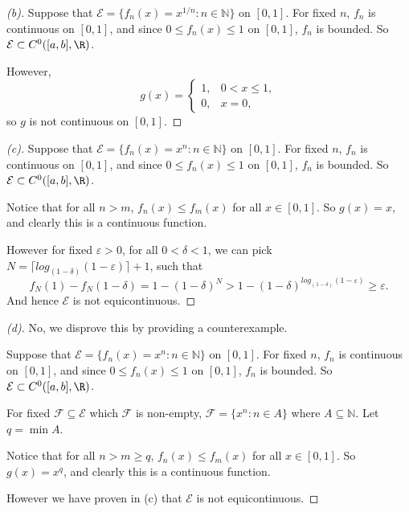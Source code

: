 \begin{proof}[(b)]
    Suppose that $\mathcal E = \{f_n(x) = x^{1/n} : n \in \mathbb{N}\}$ on $[0,1]$. For fixed $n$, $f_n$ is continuous on $[0,1]$, and since $0 \le f_n(x) \le 1$ on $[0,1]$, $f_n$ is bounded. So $\mathcal E\subset C^0([a,b], \R )$.

    However, 
    \[
        g(x)=
        \begin{cases}
        1, & 0 < x \le 1,\\
        0, & x = 0,
        \end{cases}
    \]
    so $g$ is not continuous on $[0,1]$.
\end{proof}

\begin{proof}[(c)]
    Suppose that $\mathcal E = \{f_n(x) = x^{n} : n \in \mathbb{N}\}$ on $[0,1]$. For fixed $n$, $f_n$ is continuous on $[0,1]$, and since $0 \le f_n(x) \le 1$ on $[0,1]$, $f_n$ is bounded. So $\mathcal E\subset C^0([a,b], \R )$.

    Notice that for all $n > m$, $f_n(x) \le f_m(x)$ for all $x \in [0,1]$. So $g(x) = x$, and clearly this is a continuous function.

    However for fixed $\varepsilon > 0$, for all $0 < \delta < 1$, we can pick $N = \lceil log_{(1-\delta)}(1-\varepsilon) \rceil + 1$, such that
    \[
        f_N(1) - f_N(1-\delta) = 1 - (1-\delta)^{N}  > 1 - (1-\delta) ^ {log_{(1-\delta)}(1-\varepsilon)} \ge \varepsilon.
    \]
    And hence $\mathcal E$ is not equicontinuous.

\end{proof}

\begin{proof}[(d)]
    No, we disprove this by providing a counterexample.

    Suppose that $\mathcal E = \{f_n(x) = x^{n} : n \in \mathbb{N}\}$ on $[0,1]$. For fixed $n$, $f_n$ is continuous on $[0,1]$, and since $0 \le f_n(x) \le 1$ on $[0,1]$, $f_n$ is bounded. So $\mathcal E\subset C^0([a,b], \R )$.

    For fixed $\mathcal F \subseteq \mathcal E$ which $\mathcal F$ is non-empty, $\mathcal F = \{x^n : n \in A\}$ where $A \subseteq \mathbb{N}$. Let $q = \min A$.

    Notice that for all $n > m \ge q$, $f_n(x) \le f_m(x)$ for all $x \in [0,1]$. So $g(x) = x^q$, and clearly this is a continuous function.

    However we have proven in (c) that $\mathcal E$ is not equicontinuous.
    

\end{proof}

